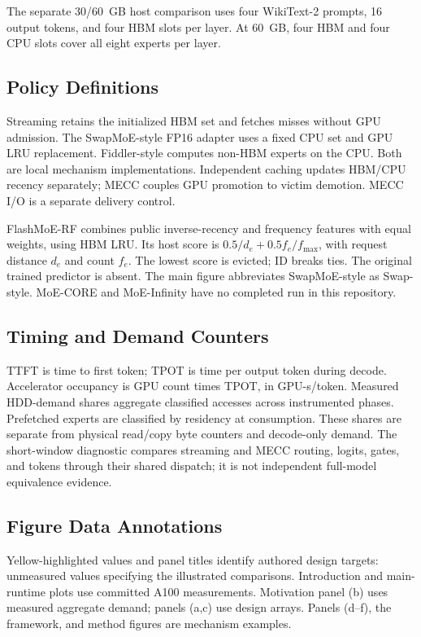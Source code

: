 \documentclass[conference,9pt,letterpaper]{IEEEtran}
\begin{document}
The separate 30/60~GB host comparison uses four WikiText-2 prompts, 16 output tokens, and four HBM slots per layer. At 60~GB, four HBM and four CPU slots cover all eight experts per layer.

\subsection{Policy Definitions}
Streaming retains the initialized HBM set and fetches misses without GPU admission. The SwapMoE-style FP16 adapter uses a fixed CPU set and GPU LRU replacement. Fiddler-style computes non-HBM experts on the CPU. Both are local mechanism implementations. Independent caching updates HBM/CPU recency separately; MECC couples GPU promotion to victim demotion. MECC I/O is a separate delivery control.

FlashMoE-RF combines public inverse-recency and frequency features with equal weights, using HBM LRU. Its host score is $0.5/d_e+0.5f_e/f_{\max}$, with request distance $d_e$ and count $f_e$. The lowest score is evicted; ID breaks ties. The original trained predictor is absent. The main figure abbreviates SwapMoE-style as Swap-style. MoE-CORE and MoE-Infinity have no completed run in this repository.

\subsection{Timing and Demand Counters}
TTFT is time to first token; TPOT is time per output token during decode. Accelerator occupancy is GPU count times TPOT, in GPU-s/token. Measured HDD-demand shares aggregate classified accesses across instrumented phases. Prefetched experts are classified by residency at consumption. These shares are separate from physical read/copy byte counters and decode-only demand. The short-window diagnostic compares streaming and MECC routing, logits, gates, and tokens through their shared dispatch; it is not independent full-model equivalence evidence.

\subsection{Figure Data Annotations}
Yellow-highlighted values and panel titles identify authored design targets: unmeasured values specifying the illustrated comparisons. Introduction and main-runtime plots use committed A100 measurements. Motivation panel (b) uses measured aggregate demand; panels (a,c) use design arrays. Panels (d--f), the framework, and method figures are mechanism examples.
\end{document}
